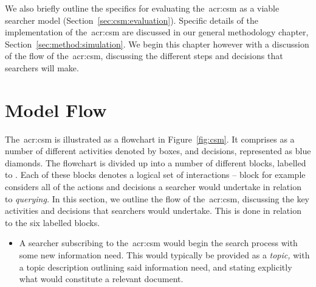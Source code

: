 We also briefly outline the specifics for evaluating the~\gls{acr:csm} as a viable searcher model (Section~\ref{sec:csm:evaluation}). Specific details of the implementation of the~\gls{acr:csm} are discussed in our general methodology chapter, Section~\ref{sec:method:simulation}. We begin this chapter however with a discussion of the flow of the~\gls{acr:csm}, discussing the different steps and decisions that searchers will make.

\section{Model Flow}\label{sec:csm:flow}
The~\gls{acr:csm} is illustrated as a flowchart in Figure~\ref{fig:csm}. It comprises as a number of different activities denoted by boxes, and decisions, represented as blue diamonds. The flowchart is divided up into a number of different blocks, labelled  to . Each of these blocks denotes a logical set of interactions -- block  for example considers all of the actions and decisions a searcher would undertake in relation to \emph{querying.} In this section, we outline the flow of the~\gls{acr:csm}, discussing the key activities and decisions that searchers would undertake. This is done in relation to the six labelled blocks.

\begin{itemize}
    
    \item[\blueboxbold{A}]{ A searcher subscribing to the~\gls{acr:csm} would begin the search process with some new information need. This would typically be provided as a \emph{topic,} with a topic description outlining said information need, and stating explicitly what would constitute a relevant document.}

\end{itemize}

